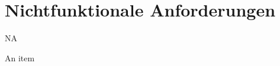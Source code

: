 \section{Nichtfunktionale Anforderungen}

\setcounter{counter}{10}
\begin{Kriterien}{NA}
    \item An item
\end{Kriterien}